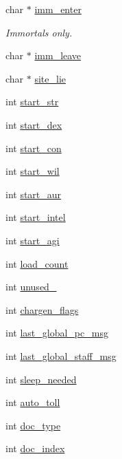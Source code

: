 \begin{DoxyCompactItemize}
char $\ast$ \hyperlink{structpc__data_a8b56470bcc1811e0e4a6a56a2b4b6983}{imm\-\_\-enter}
\begin{DoxyCompactList}\small\item\em Immortals only. \end{DoxyCompactList}\item 
char $\ast$ \hyperlink{structpc__data_a7526149f698660c25cb88568cd929421}{imm\-\_\-leave}
\item 
char $\ast$ \hyperlink{structpc__data_abcee2929e5db6713232458bbaff3d02e}{site\-\_\-lie}
\item 
int \hyperlink{structpc__data_a3c3063354941d82d27efa2073637f3ed}{start\-\_\-str}
\item 
int \hyperlink{structpc__data_ab3a6f4cd7e81ed060395b82ec853ff02}{start\-\_\-dex}
\item 
int \hyperlink{structpc__data_abf9f3411d2cf7815da649a746c5e2213}{start\-\_\-con}
\item 
int \hyperlink{structpc__data_a260fec22044e52ef9f9df9b1b0ec500e}{start\-\_\-wil}
\item 
int \hyperlink{structpc__data_a1956c6813b65fd15e27906722b051c7c}{start\-\_\-aur}
\item 
int \hyperlink{structpc__data_a763e6cb2e01859ff9acb697cd9377581}{start\-\_\-intel}
\item 
int \hyperlink{structpc__data_a877f89f01ceef0f5c4d2d2f90f594ff9}{start\-\_\-agi}
\item 
int \hyperlink{structpc__data_af97fc1fec563a98ba768139861be0dd4}{load\-\_\-count}
\item 
int \hyperlink{structpc__data_ab92382e032c54cdd911dc1c62925ca88}{unused\-\_}
\item 
int \hyperlink{structpc__data_ac631284e97db71594601048845b82cff}{chargen\-\_\-flags}
\item 
int \hyperlink{structpc__data_a8a67c955aefdd8a99859e4f096f037ee}{last\-\_\-global\-\_\-pc\-\_\-msg}
\item 
int \hyperlink{structpc__data_ad21789eb5521371ac1e5a35a4372cedb}{last\-\_\-global\-\_\-staff\-\_\-msg}
\item 
int \hyperlink{structpc__data_acde347ce5c4f7473a3f09b3c4eda14af}{sleep\-\_\-needed}
\item 
int \hyperlink{structpc__data_a609ace619c184e5295c99b84908b088e}{auto\-\_\-toll}
\item 
int \hyperlink{structpc__data_a9c52a3cc2a4feed677b28f741fd80167}{doc\-\_\-type}
\item 
int \hyperlink{structpc__data_a7f920fa9a547b89feb11beead06df248}{doc\-\_\-index}

\end{DoxyCompactItemize}
